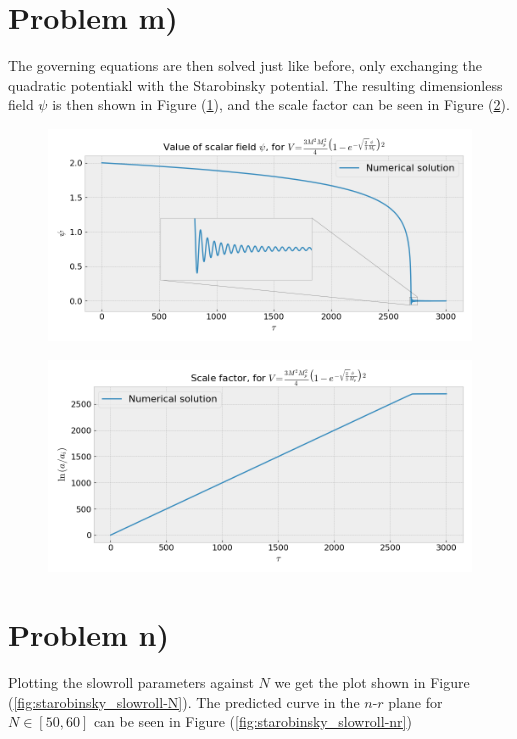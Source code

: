 \documentclass[reprint,english,notitlepage]{revtex4-1}  %
\numberwithin{equation}{section}
\begin{document}
\section{Problem m)}
The governing equations are then solved just like before, only exchanging the
quadratic potentiakl with the Starobinsky potential. The resulting dimensionless
field $\psi$ is then shown in Figure (\ref{fig:Starobinsky_psi}), and the scale
factor can be seen in Figure (\ref{fig:Starobinsky_a}).
\begin{figure}[h!]
	\includegraphics[width=\linewidth]{StarobinskyPotential_field-value.png}
	\caption{}
	\label{fig:Starobinsky_psi}
\end{figure}

\begin{figure}[h!]
	\includegraphics[width=\linewidth]{StarobinskyPotential_scale-factor.png}
	\caption{}
	\label{fig:Starobinsky_a}
\end{figure}

\section{Problem n)}
Plotting the slowroll parameters against $N$ we get the plot shown in Figure
(\ref{fig:starobinsky_slowroll-N}). The predicted curve in the $n$-$r$ plane for
$N\in[50,60]$ can be seen in Figure (\ref{fig:starobinsky_slowroll-nr})
\end{document}
